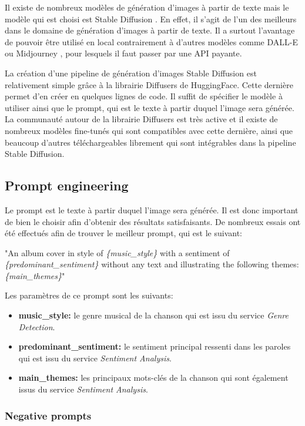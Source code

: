 Il existe de nombreux modèles de génération d'images à partir de texte mais le modèle qui est choisi est Stable Diffusion \cite{stable-diffusion}. En effet, il s'agit de l'un des meilleurs dans le domaine de génération d'images à partir de texte. Il a surtout l'avantage de pouvoir être utilisé en local contrairement à d'autres modèles comme DALL-E \cite{dall-e} ou Midjourney \cite{midjourney}, pour lesquels il faut passer par une API payante.

La création d'une pipeline de génération d'images Stable Diffusion est relativement simple grâce à la librairie Diffusers \cite{diffusers} de HuggingFace. Cette dernière permet d'en créer en quelques lignes de code. Il suffit de spécifier le modèle à utiliser ainsi que le prompt, qui est le texte à partir duquel l'image sera générée. La communauté autour de la librairie Diffusers est très active et il existe de nombreux modèles
fine-tunés qui sont compatibles avec cette dernière, ainsi que beaucoup d'autres téléchargeables librement qui sont intégrables dans la pipeline Stable Diffusion.

\subsection{Prompt engineering}
Le prompt est le texte à partir duquel l'image sera générée. Il est donc important de bien le choisir afin d'obtenir des résultats
satisfaisants. De nombreux essais ont été effectués afin de trouver le meilleur prompt, qui est le suivant:

"An album cover in style of \textit{\{music\_style\}} with a sentiment of \textit{\{predominant\_sentiment\}} without any text and illustrating the following themes: \textit{\{main\_themes\}}"

Les paramètres de ce prompt sont les suivants:

\begin{itemize}
    \item \textbf{music\_style:} le genre musical de la chanson qui est issu du service \textit{Genre Detection}.
    \item \textbf{predominant\_sentiment:} le sentiment principal ressenti dans les paroles qui est issu du service \textit{Sentiment Analysis}.
    \item \textbf{main\_themes:} les principaux mots-clés de la chanson qui sont également issus du service \textit{Sentiment Analysis}.
\end{itemize}

\subsubsection*{Negative prompts}

